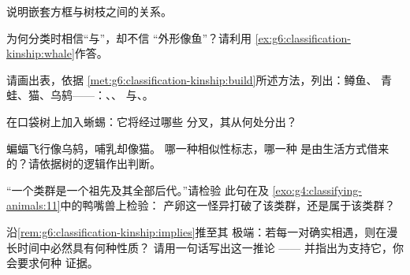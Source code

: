 \begin{exercise}[$\star$]\label{exo:g6:classification-kinship:6}
说明嵌套方框与树枝之间的关系。
\end{exercise}

\begin{exercise}[$\star\star$]\label{exo:g6:classification-kinship:7}
为何分类时相信“与”，却不信
“外形像鱼”？请利用
\cref{ex:g6:classification-kinship:whale}作答。
\end{exercise}

\begin{exercise}[$\star\star$]\label{exo:g6:classification-kinship:8}
请画出表，依据
\cref{met:g6:classification-kinship:build}所述方法，列出：鳟鱼、
青蛙、猫、乌鸫——：、、
与、。
\end{exercise}

\begin{exercise}[$\star\star$]\label{exo:g6:classification-kinship:9}
在口袋树上加入蜥蜴：它将经过哪些
分叉，其从何处分出？
\end{exercise}

\begin{exercise}[$\star\star$]\label{exo:g6:classification-kinship:10}
蝙蝠飞行像乌鸫，哺乳却像猫。
哪一种相似性标志，哪一种
是由生活方式借来的？请依据树的逻辑作出判断。
\end{exercise}

\begin{exercise}[$\star\star$]\label{exo:g6:classification-kinship:11}
“一个类群是一个祖先及其全部后代。”请检验
此句在及
\cref{exo:g4:classifying-animals:11}中的鸭嘴兽上检验：
产卵这一怪异打破了该类群，还是属于该类群？
\end{exercise}

\begin{exercise}[$\star\star\star$]\label{exo:g6:classification-kinship:12}
沿\cref{rem:g6:classification-kinship:implies}推至其
极端：若每一对确实相遇，则在漫长时间中必然具有何种性质？
请用一句话写出这一推论 ——
并指出为支持它，你会要求何种
证据。
\end{exercise}

